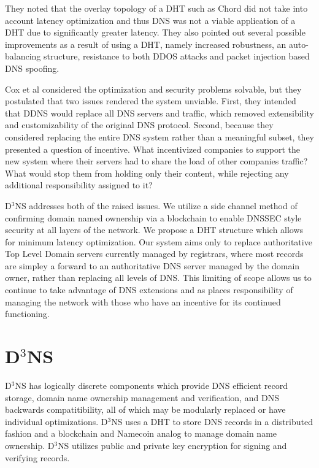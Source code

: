 \documentclass[11pt]{IEEEtran} %
\begin{document}
They noted that the overlay topology of a DHT such as Chord did not take into account latency optimization and thus DNS was not a viable application of a DHT due to significantly greater latency. They also pointed out several possible improvements as a result of using a DHT, namely increased robustness, an auto-balancing structure, resistance to both DDOS attacks and packet injection based DNS spoofing.


Cox et al considered the optimization and security problems solvable, but they postulated that two issues rendered the system unviable. First, they intended that DDNS would replace all DNS servers and traffic, which removed extensibility and customizability of the original DNS protocol. Second, because they considered replacing the entire DNS system rather than a meaningful subset, they presented a question of incentive. What incentivized companies to support the new system where their servers had to share the load of other companies traffic?  What would stop them from holding only their content, while rejecting any additional responsibility assigned to it?
 
 
D$^3$NS addresses both of the raised issues. We utilize a side channel method of confirming domain named ownership via a blockchain \cite{namecoin} to enable DNSSEC style security at all layers of the network. We propose a DHT structure which allows for minimum latency optimization. Our system aims only to replace authoritative Top Level Domain servers currently managed by registrars, where most records are simpley a forward to an authoritative DNS server managed by the domain owner, rather than replacing all levels of DNS. This limiting of scope allows us to continue to take advantage of DNS extensions and as places responsibility of managing the network with those who have an incentive for its continued functioning.



\section{D$^{3}$NS}
D$^{3}$NS has logically discrete components which provide DNS efficient record storage, domain name ownership management and verification, and DNS backwards compatitibility, all of which may be modularly replaced or have individual optimizations. D$^{3}$NS uses a DHT to store DNS records in a distributed fashion and a blockchain and Namecoin\cite{namecoin} analog to manage domain name ownership.  D$^{3}$NS utilizes public and private key encryption for signing and verifying records.
\end{document}
